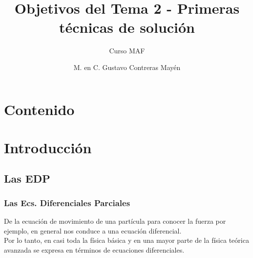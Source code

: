 \documentclass[12pt]{beamer}
\date{}
\title{\large{Objetivos del Tema 2 - Primeras técnicas de solución}}
\subtitle{Curso MAF}
\author{M. en C. Gustavo Contreras Mayén}
\begin{document}
\maketitle
\fontsize{14}{14}\selectfont
{}
\section*{Contenido}
\section{Introducción}
\subsection{Las EDP}
\begin{frame}
\frametitle{Las Ecs. Diferenciales Parciales}
De la ecuación de movimiento de una partícula para conocer la fuerza por ejemplo, en general nos conduce a una ecuación diferencial.
\\
\bigskip
Por lo tanto, en casi toda la física  básica y en una mayor parte de la física teórica avanzada se expresa en términos de ecuaciones diferenciales.
\end{frame}
\end{document}
